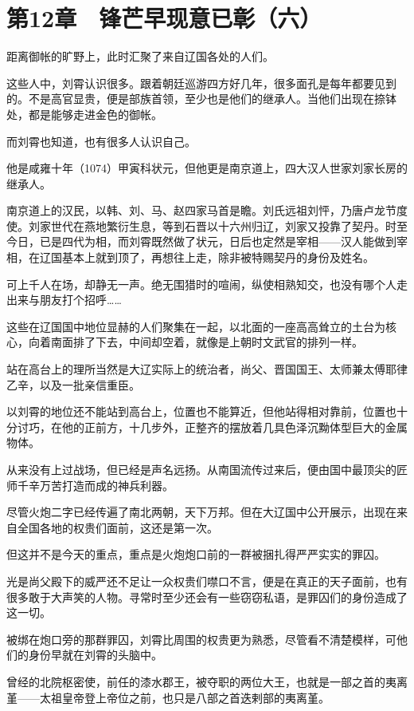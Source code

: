 \section{第12章　锋芒早现意已彰（六）}

距离御帐的旷野上，此时汇聚了来自辽国各处的人们。

这些人中，刘霄认识很多。跟着朝廷巡游四方好几年，很多面孔是每年都要见到的。不是高官显贵，便是部族首领，至少也是他们的继承人。当他们出现在捺钵处，都是能够走进金色的御帐。

而刘霄也知道，也有很多人认识自己。

他是咸雍十年（1074）甲寅科状元，但他更是南京道上，四大汉人世家刘家长房的继承人。

南京道上的汉民，以韩、刘、马、赵四家马首是瞻。刘氏远祖刘怦，乃唐卢龙节度使。刘家世代在燕地繁衍生息，等到石晋以十六州归辽，刘家又投靠了契丹。时至今日，已是四代为相，而刘霄既然做了状元，日后也定然是宰相——汉人能做到宰相，在辽国基本上就到顶了，再想往上走，除非被特赐契丹的身份及姓名。

可上千人在场，却静无一声。绝无围猎时的喧闹，纵使相熟知交，也没有哪个人走出来与朋友打个招呼……

这些在辽国国中地位显赫的人们聚集在一起，以北面的一座高高耸立的土台为核心，向着南面排了下去，中间却空着，就像是上朝时文武官的排列一样。

站在高台上的理所当然是大辽实际上的统治者，尚父、晋国国王、太师兼太傅耶律乙辛，以及一批亲信重臣。

以刘霄的地位还不能站到高台上，位置也不能算近，但他站得相对靠前，位置也十分讨巧，在他的正前方，十几步外，正整齐的摆放着几具色泽沉黝体型巨大的金属物体。

从来没有上过战场，但已经是声名远扬。从南国流传过来后，便由国中最顶尖的匠师千辛万苦打造而成的神兵利器。

尽管火炮二字已经传遍了南北两朝，天下万邦。但在大辽国中公开展示，出现在来自全国各地的权贵们面前，这还是第一次。

但这并不是今天的重点，重点是火炮炮口前的一群被捆扎得严严实实的罪囚。

光是尚父殿下的威严还不足让一众权贵们噤口不言，便是在真正的天子面前，也有很多敢于大声笑的人物。寻常时至少还会有一些窃窃私语，是罪囚们的身份造成了这一切。

被绑在炮口旁的那群罪囚，刘霄比周围的权贵更为熟悉，尽管看不清楚模样，可他们的身份早就在刘霄的头脑中。

曾经的北院枢密使，前任的漆水郡王，被夺职的两位大王，也就是一部之首的夷离堇——太祖皇帝登上帝位之前，也只是八部之首迭剌部的夷离堇。

